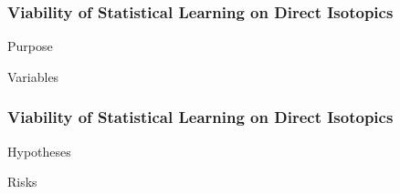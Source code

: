 
\begin{frame}
  \frametitle{Viability of Statistical Learning on Direct Isotopics}
  Purpose

  Variables
\end{frame}

\begin{frame}
  \frametitle{Viability of Statistical Learning on Direct Isotopics}
  Hypotheses

  Risks
\end{frame}

